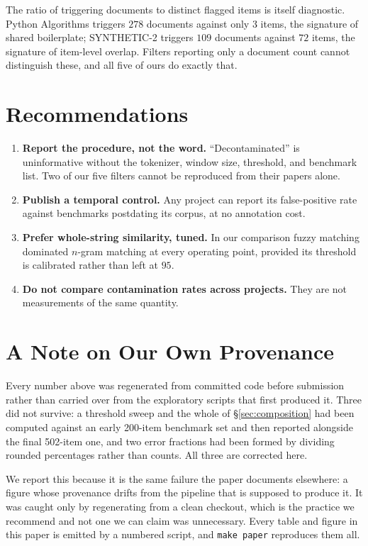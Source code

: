 \documentclass[11pt]{article}
\begin{document}
The ratio of triggering documents to distinct flagged items is itself diagnostic.
Python Algorithms triggers $278$ documents against only $3$ items, the signature of
shared boilerplate; SYNTHETIC-2 triggers $109$ documents against $72$ items, the
signature of item-level overlap. Filters reporting only a document count cannot
distinguish these, and all five of ours do exactly that.

\section{Recommendations}

\begin{enumerate}
\item \textbf{Report the procedure, not the word.} ``Decontaminated'' is
uninformative without the tokenizer, window size, threshold, and benchmark list.
Two of our five filters cannot be reproduced from their papers alone.
\item \textbf{Publish a temporal control.} Any project can report its
false-positive rate against benchmarks postdating its corpus, at no annotation
cost.
\item \textbf{Prefer whole-string similarity, tuned.} In our comparison fuzzy
matching dominated $n$-gram matching at every operating point, provided its
threshold is calibrated rather than left at $95$.
\item \textbf{Do not compare contamination rates across projects.} They are not
measurements of the same quantity.
\end{enumerate}

\section{A Note on Our Own Provenance}

Every number above was regenerated from committed code before submission rather
than carried over from the exploratory scripts that first produced it. Three did
not survive: a threshold sweep and the whole of \S\ref{sec:composition} had been
computed against an early 200-item benchmark set and then reported alongside the
final 502-item one, and two error fractions had been formed by dividing rounded
percentages rather than counts. All three are corrected here.

We report this because it is the same failure the paper documents elsewhere: a
figure whose provenance drifts from the pipeline that is supposed to produce it.
It was caught only by regenerating from a clean checkout, which is the practice
we recommend and not one we can claim was unnecessary. Every table and figure in
this paper is emitted by a numbered script, and \texttt{make paper} reproduces
them all.
\end{document}

